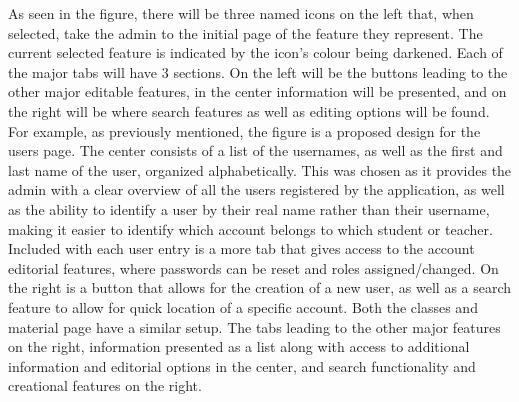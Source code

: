 \noindent
As seen in the figure, there will be three named icons on the left that, when selected, take the admin to the initial page of the feature they represent. The current selected feature is indicated by the icon's colour being darkened. Each of the major tabs will have 3 sections. On the left will be the buttons leading to the other major editable features, in the center information will be presented, and on the right will be where search features as well as editing options will be found.
\newline\newline
For example, as previously mentioned, the figure is a proposed design for the users page. The center consists of a list of the usernames, as well as the first and last name of the user, organized alphabetically. This was chosen as it provides the admin with a clear overview of all the users registered by the application, as well as the ability to identify a user by their real name rather than their username, making it easier to identify which account belongs to which student or teacher. Included with each user entry is a more tab that gives access to the account editorial features, where passwords can be reset and roles assigned/changed. On the right is a button that allows for the creation of a new user, as well as a search feature to allow for quick location of a specific account.
\newline\newline
Both the classes and material page have a similar setup. The tabs leading to the other major features on the right, information presented as a list along with access to additional information and editorial options in the center, and search functionality and creational features on the right. 